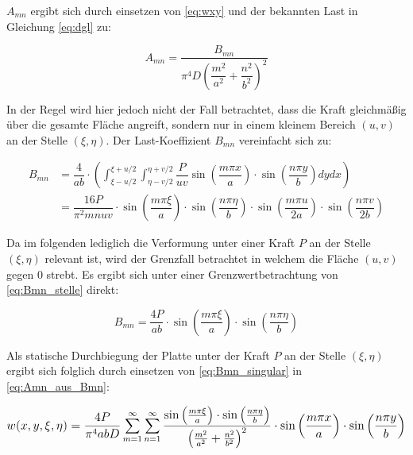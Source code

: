 $A_{mn}$ ergibt sich durch einsetzen von \ref{eq:wxy} und der bekannten Last in Gleichung \ref{eq:dgl} zu:

\begin{equation}
A_{mn} = \dfrac{B_{mn}}{\pi^4 D \left(\dfrac{m^2}{a^2} + \dfrac{n^2}{b^2} \right)^2}
\label{eq:Amn_aus_Bmn}
\end{equation}

In der Regel wird hier jedoch nicht der Fall betrachtet, dass die Kraft gleichmäßig über die gesamte Fläche angreift, sondern nur in einem kleinem Bereich $(u,v)$ an der Stelle $(\xi, \eta)$. Der Last-Koeffizient $B_{mn}$ vereinfacht sich zu:

\begin{align}
B_{mn} &= \dfrac{4}{ab} \cdot \left( \int_{\xi-u/2}^{\xi+u/2} \int_{\eta - v/2}^{\eta + v/2} \dfrac{P}{u v}
\sin\left(\dfrac{m \pi x}{a}\right) \cdot \sin\left( \dfrac{n \pi y}{b} \right)dy dx\right) \\
&= \dfrac{16P}{\pi^2 m n u v} 
\cdot \sin\left(\dfrac{m \pi \xi}{a}\right) 
\cdot \sin\left(\dfrac{n \pi \eta}{b}\right) 
\cdot \sin\left(\dfrac{m \pi u}{2a}\right) 
\cdot \sin\left(\dfrac{n \pi v}{2b}\right)
\label{eq:Bmn_stelle}
\end{align}

Da im folgenden lediglich die Verformung unter einer Kraft $P$ an der Stelle $(\xi, \eta)$ relevant ist, wird der Grenzfall betrachtet in welchem die Fläche $(u,v)$ gegen 0 strebt. Es ergibt sich unter einer Grenzwertbetrachtung von \ref{eq:Bmn_stelle} direkt:

\begin{equation}
B_{mn} = \dfrac{4P}{a b} 
\cdot \sin\left(\dfrac{m \pi \xi}{a}\right) 
\cdot \sin\left(\dfrac{n \pi \eta}{b}\right) 
\label{eq:Bmn_singular}
\end{equation}

Als statische Durchbiegung der Platte unter der Kraft $P$ an der Stelle $(\xi, \eta)$ ergibt sich folglich durch einsetzen von \ref{eq:Bmn_singular} in \ref{eq:Amn_aus_Bmn}:
 
\begin{equation}
 \mathlarger{
 	w(x,y,\xi,\eta) = \frac{4P}{\pi^4 a b D} 
 	\sum_{m = 1}^{\infty} \sum_{n = 1}^{\infty}
 	\frac{
 		\sin\left(\frac{m \pi \xi}{a}\right) 
 		\cdot \sin\left(\frac{n \pi \eta}{b}\right) 
 	}{
 		\left( 
 		\frac{m^2}{a^2} +
 		\frac{n^2}{b^2}
 		\right)^2
 	}
 	\cdot \sin\left(\frac{m \pi x}{a}\right) 
 	\cdot \sin\left(\frac{n \pi y}{b}\right) 
 }
 \end{equation}
 

